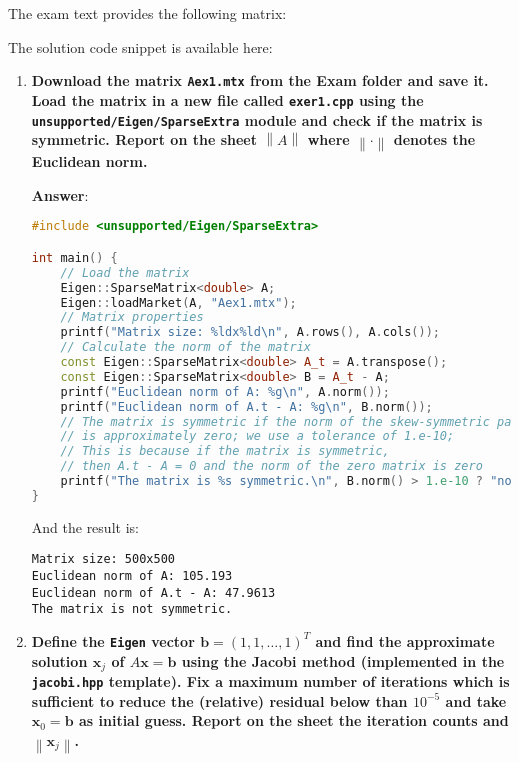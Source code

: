 The exam text provides the following matrix:
\begin{center}
\end{center}
The solution code snippet is available here:
\begin{center}
\end{center}
\begin{enumerate}[label=\textcolor{Green3}{\textbf{\arabic*.}}]
    \item \textcolor{Green3}{\textbf{%
        Download the matrix \texttt{Aex1.mtx} from the Exam folder and save it. Load the matrix in a new ﬁle called \texttt{exer1.cpp} using the \texttt{unsupported/Eigen/SparseExtra} module and check if the matrix is symmetric. Report on the sheet $\left\|A\right\|$ where $\left\|\cdot\right\|$ denotes the Euclidean norm.
    }}

    \textbf{Answer}:
    \begin{lstlisting}[language=C++]
#include <unsupported/Eigen/SparseExtra>

int main() {
    // Load the matrix
    Eigen::SparseMatrix<double> A;
    Eigen::loadMarket(A, "Aex1.mtx");
    // Matrix properties
    printf("Matrix size: %ldx%ld\n", A.rows(), A.cols());
    // Calculate the norm of the matrix
    const Eigen::SparseMatrix<double> A_t = A.transpose();
    const Eigen::SparseMatrix<double> B = A_t - A;
    printf("Euclidean norm of A: %g\n", A.norm());
    printf("Euclidean norm of A.t - A: %g\n", B.norm());
    // The matrix is symmetric if the norm of the skew-symmetric part
    // is approximately zero; we use a tolerance of 1.e-10;
    // This is because if the matrix is symmetric,
    // then A.t - A = 0 and the norm of the zero matrix is zero
    printf("The matrix is %s symmetric.\n", B.norm() > 1.e-10 ? "not" : "");
}\end{lstlisting}
    And the result is:
    \begin{lstlisting}
Matrix size: 500x500
Euclidean norm of A: 105.193
Euclidean norm of A.t - A: 47.9613
The matrix is not symmetric.\end{lstlisting}


    \newpage

    \item \textcolor{Green3}{\textbf{%
        Define the \texttt{Eigen} vector $\mathbf{b} = \left(1, 1, \dots, 1\right)^{T}$ and find the approximate solution $\mathbf{x}_{j}$ of $A\mathbf{x} = \mathbf{b}$ using the Jacobi method (implemented in the \texttt{jacobi.hpp} template). Fix a maximum number of iterations which is sufficient to reduce the (relative) residual below than $10^{-5}$ and take $\mathbf{x}_{0} = \mathbf{b}$ as initial guess. Report on the sheet the iteration counts and $\left\| \mathbf{x}_{j} \right\|$.
    }}


\end{enumerate}
